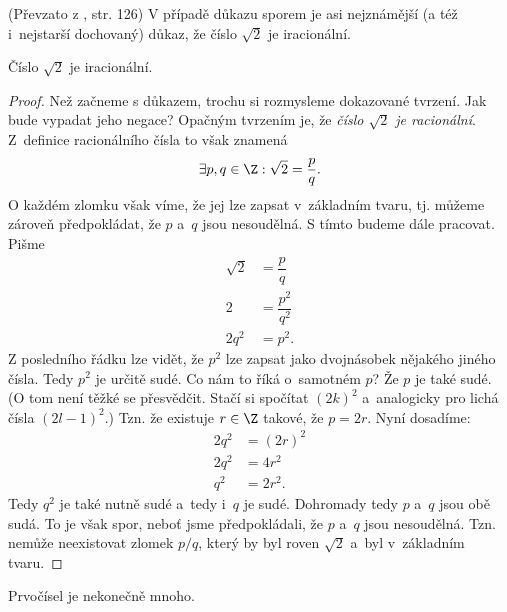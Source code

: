 (Převzato z \cite{ChartrandPolimeniZhang2014}, str. 126)
V případě důkazu sporem je asi nejznámější (a též i~nejstarší dochovaný) důkaz, že číslo $\sqrt{2}$ je iracionální.
\begin{proposition}
    Číslo $\sqrt{2}$ je iracionální.
\end{proposition}
\begin{proof}
    Než začneme s důkazem, trochu si rozmysleme dokazované tvrzení. Jak bude vypadat jeho negace? Opačným tvrzením je, že \emph{číslo $\sqrt{2}$ je racionální}. Z~definice racionálního čísla to však znamená
    \begin{equation*}
        \exists p,q\in\Z : \sqrt{2}=\dfrac{p}{q}.
    \end{equation*}
    O každém zlomku však víme, že jej lze zapsat v~základním tvaru, tj. můžeme zároveň předpokládat, že $p$ a~$q$ jsou nesoudělná. S tímto budeme dále pracovat. Pišme
    \begin{align*}
        \sqrt{2}&=\dfrac{p}{q}\\
        2&=\dfrac{p^2}{q^2}\\
        2q^2&=p^2.
    \end{align*}
    Z posledního řádku lze vidět, že $p^2$ lze zapsat jako dvojnásobek nějakého jiného čísla. Tedy $p^2$ je určitě sudé. Co nám to říká o~samotném $p$? Že $p$ je také sudé. (O tom není těžké se přesvědčit. Stačí si spočítat $(2k)^2$ a~analogicky pro lichá čísla $(2l-1)^2$.) Tzn. že existuje $r\in\Z$ takové, že $p=2r$. Nyní dosadíme:
    \begin{align*}
        2q^2&=(2r)^2\\
        2q^2&=4r^2\\
        q^2&=2r^2.
    \end{align*}
    Tedy $q^2$ je také nutně sudé a~tedy i~$q$ je sudé. Dohromady tedy $p$ a~$q$ jsou obě sudá. To je však spor, neboť jsme předpokládali, že $p$ a~$q$ jsou nesoudělná. Tzn. nemůže neexistovat zlomek $p/q$, který by byl roven $\sqrt{2}$ a~byl v~základním tvaru.
\end{proof}
\begin{proposition}\label{prop:prvocisla}
    Prvočísel je nekonečně mnoho.
\end{proposition}
